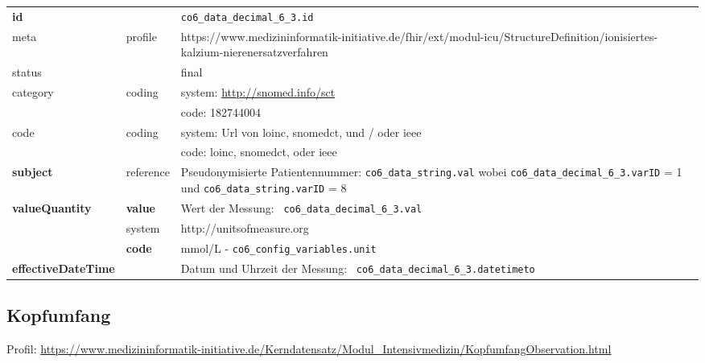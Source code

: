 \begin{longtable}{|l|l|p{7.5cm}|}
        \hline
        \rowcolor{lightgray} \multicolumn{3}{|l|}{Data Mapping (inhaltlich)} \\ \hline
        \textbf{id} &  & \texttt{co6\_data\_decimal\_6\_3.id} \\ \hline
	meta & profile & https://www.medizininformatik-initiative.de/fhir/ext/modul-icu/StructureDefinition/ionisiertes-kalzium-nierenersatzverfahren \\ \hline 
	status &  & final   \\ \hline 
	category & coding & system: \url{http://snomed.info/sct} \\
\cline{3-3}
	& & code: 182744004 \\ \hline
	code & coding & system: Url von \ac{loinc}, \ac{snomedct}, und / oder \ac{ieee} \\ 
	\cline{3-3} 
	 &  & code: \ac{loinc}, \ac{snomedct}, oder \ac{ieee} \\ \hline
	 \textbf{subject} & reference & Pseudonymisierte Patientennummer: \texttt{co6\_data\_string.val} wobei \texttt{co6\_data\_decimal\_6\_3.varID} = 1 und \texttt{co6\_data\_string.varID} = 8 \\ \hline
	 \textbf{valueQuantity}  & \textbf{value} & Wert der Messung: \texttt{
co6\_data\_decimal\_6\_3.val} \\
        \cline{2-3}
         & system & http://unitsofmeasure.org \\
         \cline{2-3}
         & \textbf{code} & mmol/L - \texttt{co6\_config\_variables.unit} \\ \hline
     \textbf{effectiveDateTime}  & & Datum und Uhrzeit der Messung: \texttt{
co6\_data\_decimal\_6\_3.datetimeto} \\ \hline
\end{longtable}

\subsection{Kopfumfang} 

Profil: \url{https://www.medizininformatik-initiative.de/Kerndatensatz/Modul_Intensivmedizin/KopfumfangObservation.html}


